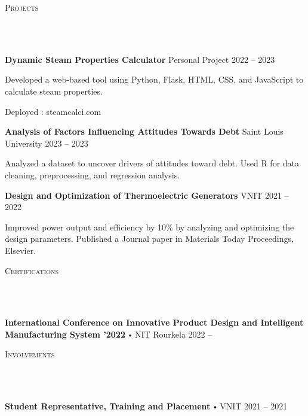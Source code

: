 \documentclass{article}
\newcommand{\project}[4]{{
          \vspace*{2pt}%
          \textbf{#1} #2 \hfill #3\\ #4 \vspace*{2pt}}
          }
\newcommand{\lineunder}{
        \vspace*{-8pt} \\ \hspace*{-18pt} 
        \hrulefill \\
        }
\newcommand{\header}[1]{{
        \hspace*{-15pt}\vspace*{6pt} \textsc{#1}} \vspace*{-6pt} 
        \lineunder
        }
\renewcommand{\labelitemi}{
        $\vcenter{\hbox{\tiny$\bullet$}}$\hspace*{3pt}
        }
\renewcommand{\labelitemii}{
        $\vcenter{\hbox{\tiny$\bullet$}}$\hspace*{-3pt}
        }
\newenvironment{bullet-list-major}{
          \begin{list}{\labelitemii}{\setlength\leftmargin{3pt} 
          \topsep 0pt \itemsep -2pt}}{\vspace*{4pt}\end{list}
          }
\newenvironment{bullet-list-minor}{
          \begin{list}{\labelitemii}{\setlength\leftmargin{15pt} 
            \topsep 0pt \itemsep -2pt}}{\vspace*{4pt}\end{list}
            }
\begin{document}
      \vspace*{4pt}%
      \header{Projects}
      {
      \project{Dynamic Steam Properties Calculator}{Personal Project}{2022 -- 2023}{
          \begin{bullet-list-minor}
              \item Developed a web-based tool using Python, Flask, HTML, CSS, and JavaScript to calculate steam properties.
\item Deployed : steamcalci.com
          \end{bullet-list-minor}
      }
  

      \project{Analysis of Factors Influencing Attitudes Towards Debt}{Saint Louis University}{2023 -- 2023}{
          \begin{bullet-list-minor}
              \item Analyzed a dataset to uncover drivers of attitudes toward debt. Used R for data cleaning, preprocessing, and regression analysis.
          \end{bullet-list-minor}
      }
  

      \project{Design and Optimization of Thermoelectric Generators}{VNIT}{2021 -- 2022}{
          \begin{bullet-list-minor}
              \item Improved power output and efficiency by 10\% by analyzing and optimizing the design parameters. Published a Journal paper in Materials Today Proceedings, Elsevier.
          \end{bullet-list-minor}
      }
  }
  
      \vspace*{4pt}%
      \header{Certifications}
      {
        \begin{bullet-list-major}
        \item \textbf{International Conference on Innovative Product Design and Intelligent Manufacturing System ’2022} \labelitemi NIT Rourkela \hfill 2022 -- 
        \end{bullet-list-major}
        }
      \vspace*{4pt}%
      \header{Involvements}
      {
            \begin{bullet-list-major}
            \item \textbf{Student Representative, Training and Placement} \labelitemi VNIT \hfill 2021 -- 2021
            
            \end{bullet-list-major}
            }
      
\end{document}
